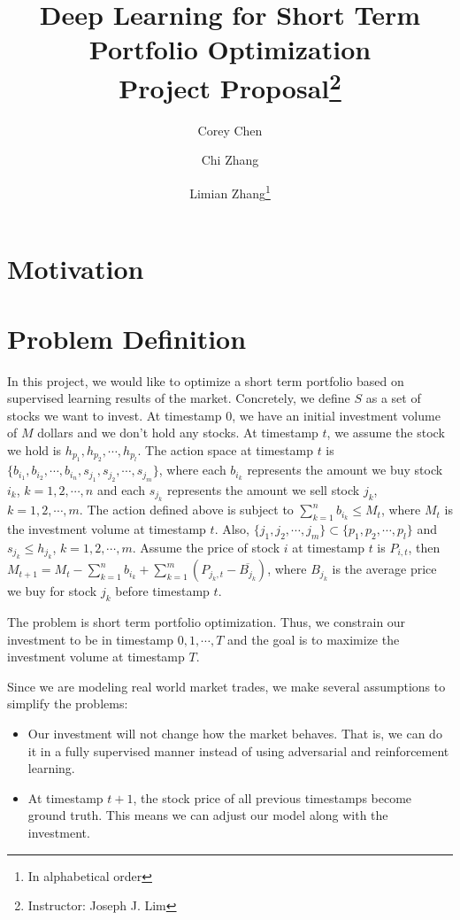 \documentclass[a4paper, 11pt]{article}
\title{\textbf{Deep Learning for Short Term Portfolio Optimization}\\Project Proposal\thanks{Instructor: Joseph J. Lim}}
\author[]{Corey Chen}
\author[]{Chi Zhang}
\author[]{Limian Zhang\footnote{In alphabetical order}}
\affil[]{Department of Computer Science}
\begin{document}
  \maketitle                     %
  \begin{spacing}{1}
    \section{Motivation}
    
    \section{Problem Definition}
    In this project, we would like to optimize a short term portfolio based on supervised learning results of the market. Concretely, we define $S$ as a set of stocks we want to invest. At timestamp 0, we have an initial investment volume of $M$ dollars and we don't hold any stocks. At timestamp $t$, we assume the stock we hold is $h_{p_1}, h_{p_2}, \cdots, h_{p_l}$. The action space at timestamp $t$ is $\{b_{i_1}, b_{i_2},\cdots, b_{i_n}, s_{j_1}, s_{j_2}, \cdots, s_{j_m}\}$, where each $b_{i_k}$ represents the amount we buy stock $i_k$, $k=1, 2, \cdots, n$ and each $s_{j_k}$ represents the amount we sell stock $j_k$, $k=1, 2, \cdots, m$. The action defined above is subject to $\sum_{k=1}^{n}b_{i_k}\leq M_t$, where $M_t$ is the investment volume at timestamp $t$. Also, $\{j_1, j_2, \cdots, j_m\}\subset\{p_1, p_2, \cdots, p_l\}$ and $s_{j_k}\leq h_{j_k}$, $k=1, 2, \cdots, m$. Assume the price of stock $i$ at timestamp $t$ is $P_{i, t}$, then $M_{t+1} = M_{t} - \sum_{k=1}^{n}b_{i_k} + \sum_{k=1}^{m}(P_{j_k, t} - \overline{B_{j_k}})$, where $B_{j_k}$ is the average price we buy for stock $j_k$ before timestamp $t$. 
    
    The problem is short term portfolio optimization. Thus, we constrain our investment to be in timestamp $0, 1, \cdots, T$ and the goal is to maximize the investment volume at timestamp $T$.
    
    Since we are modeling real world market trades, we make several assumptions to simplify the problems:
    \begin{itemize}
      \item Our investment will not change how the market behaves. That is, we can do it in a fully supervised manner instead of using adversarial and reinforcement learning.
      \item At timestamp $t+1$, the stock price of all previous timestamps become ground truth. This means we can adjust our model along with the investment.
    \end{itemize}
    

\end{spacing}
\end{document}
